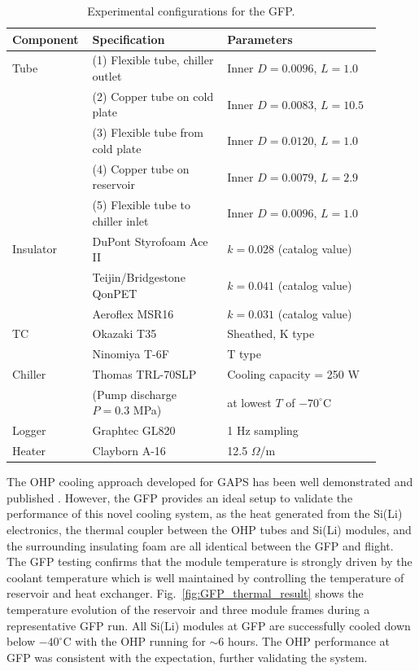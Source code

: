 \begin{table}
\centering
\begin{tabular}{p{0.15\linewidth}p{0.35\linewidth}p{0.4\linewidth}}
\toprule
\textbf{Component} & \textbf{Specification} & \textbf{Parameters} \\
\midrule
Tube & (1) Flexible tube, chiller outlet & Inner $D = 0.0096$, $L = 1.0$ \\
 & (2) Copper tube on cold plate & Inner $D = 0.0083$, $L = 10.5$ \\
 & (3) Flexible tube from cold plate & Inner $D = 0.0120$, $L = 1.0$ \\
 & (4) Copper tube on reservoir & Inner $D = 0.0079$, $L = 2.9$ \\
 & (5) Flexible tube to chiller inlet & Inner $D = 0.0096$, $L = 1.0$ \\
\midrule
Insulator & DuPont Styrofoam Ace II & $k = 0.028$ (catalog value) \\
 & Teijin/Bridgestone QonPET & $k = 0.041$ (catalog value) \\
 & Aeroflex MSR16 & $k = 0.031$ (catalog value) \\
\midrule
TC & Okazaki T35 & Sheathed, K type \\
 & Ninomiya T-6F & T type \\
\midrule
Chiller & Thomas TRL-70SLP & Cooling capacity = 250 W \\
 & (Pump discharge $P = 0.3$ MPa) & at lowest $T$ of $-70^\circ$C \\
\midrule
Logger & Graphtec GL820 & 1 Hz sampling \\
\midrule
Heater & Clayborn A-16 & 12.5 $\Omega$/m \\
\bottomrule
\end{tabular}
\caption{Experimental configurations for the \ac{GFP}.}
\label{tab:experimental_config}
\end{table}


The \ac{OHP} cooling approach developed for \ac{GAPS} has been well demonstrated and published \cite{FUKE2023168102, OKAZAKI201820, doi:10.1142/S2251171714400042}. However, the \ac{GFP} provides an ideal setup to validate the performance of this novel cooling system, as the heat generated from the \ac{Si(Li)} electronics, the thermal coupler between the \ac{OHP} tubes and \ac{Si(Li)} modules, and the surrounding insulating foam are all identical between the \ac{GFP} and flight. The \ac{GFP} testing confirms that the module temperature is strongly driven by the coolant temperature which is well maintained by controlling the temperature of reservoir and heat exchanger. Fig.~\ref{fig:GFP_thermal_result} shows the temperature evolution of the reservoir and three module frames during a representative \ac{GFP} run. All \ac{Si(Li)} modules at \ac{GFP} are successfully cooled down below $-40^\circ$C with the \ac{OHP} running for $\sim$6 hours. The \ac{OHP} performance at \ac{GFP} was consistent with the expectation, further validating the system.

